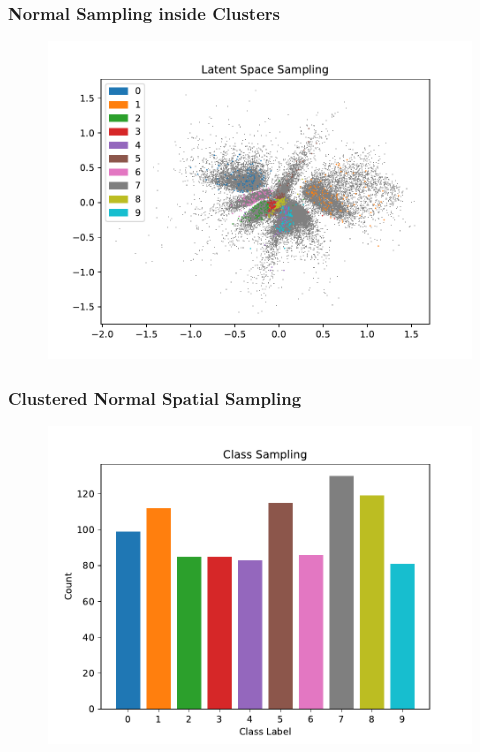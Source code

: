 \documentclass[10pt, usenames, dvipsnames, table]{beamer}
\begin{document}
\begin{frame}
  \frametitle{Normal Sampling inside Clusters}
  \begin{figure}
    \centering
    \includegraphics[width=\linewidth]
    {models/mnist_vaestudent_e300_L2_b64/multi-normal-cluster_sampling_1000}
    \caption{}
    \label{}
  \end{figure}
\end{frame}

\begin{frame}
  \frametitle{Clustered Normal Spatial Sampling}
  \begin{figure}
    \centering
    \includegraphics[width=\linewidth]
    {models/mnist_vaestudent_e300_L2_b64/multi-normal-cluster_sampling_distribution_1000}
    \caption{}
    \label{}
  \end{figure}
\end{frame}
\end{document}
